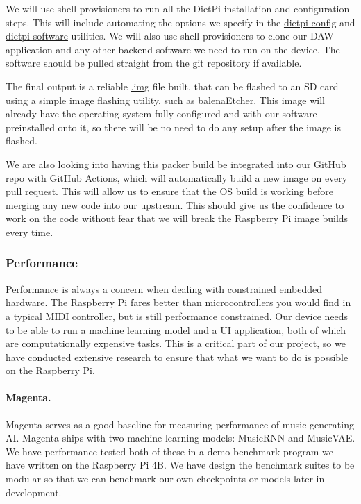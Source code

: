 We will use shell provisioners to run all the DietPi installation and configuration steps.
This will include automating the options we specify in the \url{dietpi-config} and
\url{dietpi-software} utilities. We will also use shell provisioners to clone our DAW
application and any other backend software we need to run on the device. The software
should be pulled straight from the git repository if available.

The final output is a reliable \url{.img} file built, that can be flashed to an SD card
using a simple image flashing utility, such as balenaEtcher. This image will already have
the operating system fully configured and with our software preinstalled onto it, so there
will be no need to do any setup after the image is flashed.

We are also looking into having this packer build be integrated into our GitHub repo with
GitHub Actions, which will automatically build a new image on every pull request. This
will allow us to ensure that the OS build is working before merging any new code into our
upstream. This should give us the confidence to work on the code without fear that we will
break the Raspberry Pi image builds every time.

\subsubsection{Performance}

Performance is always a concern when dealing with constrained embedded hardware. The
Raspberry Pi fares better than microcontrollers you would find in a typical MIDI
controller, but is still performance constrained. Our device needs to be able to run a
machine learning model and a UI application, both of which are computationally expensive
tasks. This is a critical part of our project, so we have conducted extensive research to
ensure that what we want to do is possible on the Raspberry Pi.

\paragraph{Magenta.}

Magenta serves as a good baseline for measuring performance of music generating AI.
Magenta ships with two machine learning models: MusicRNN and MusicVAE. We have performance
tested both of these in a demo benchmark program we have written on the Raspberry Pi 4B.
We have design the benchmark suites to be modular so that we can benchmark our own
checkpoints or models later in development.

